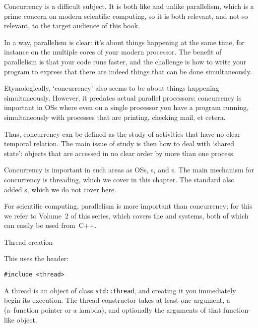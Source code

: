 
Concurrency is a difficult subject.
It is both like and unlike parallelism,
which is a prime concern on modern scientific computing,
so it is both relevant, and not-so relevant,
to the target audience of this book.

In a way, parallelism is clear: it's about things happening at the same time,
for instance on the multiple cores of your modern processor.
The benefit of parallelism is that your code runs faster,
and the challenge is how to write your program
to express that there are indeed things that can be done simultaneously.

Etymologically, `concurrency' also seems to be about things
happening simultaneously. However, it predates actual parallel processors:
concurrency is important in \acp{OS} where even on a single processor
you have a program running, simultaneously with processes that are printing,
checking mail, et cetera.

Thus, concurrency can be defined as the study of activities that have no clear
temporal relation. The main issue of study is then how to deal with `shared state':
objects that are accessed in no clear order by more than one process.

Concurrency is important in such areas as \acp{OS}, s,
and s.
The main mechanism for concurrency is threading, which we cover in this chapter.
The  standard also added s,
which we do not cover here.

For scientific computing, parallelism is more important than concurrency;
for this we refer to Volume~2 of this series,
which covers the  and  systems,
both of which can easily be used from~C++.

 {Thread creation}
\label{sec:cpp-thread}

This uses the  header:
\begin{lstlisting}
#include <thread>
\end{lstlisting}

A thread is an object of class \lstinline+std::thread+,
and creating it you immediately begin its execution.
The thread constructor takes at least one argument,
a 
(a~function pointer or a lambda),
and optionally the arguments of that function-like object.

